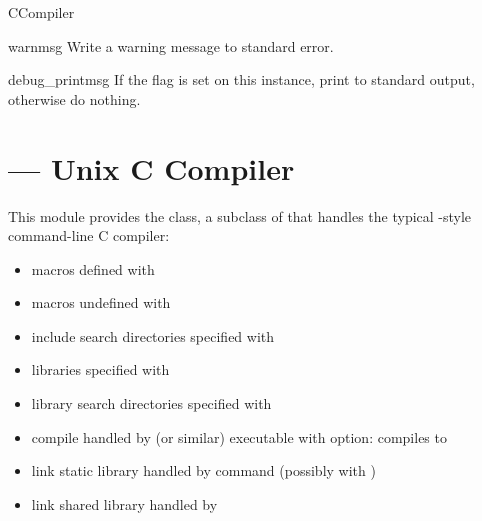 \documentclass{manual}
\begin{document}
\begin{classdesc}{CCompiler}{}
\begin{methoddesc}{warn}{msg}
Write a warning message  to standard error.
\end{methoddesc}

\begin{methoddesc}{debug_print}{msg}
If the  flag is set on this  instance, print 
 to standard output, otherwise do nothing.
\end{methoddesc}

\end{classdesc}

%

\section{ --- Unix C Compiler}

This module provides the  class, a subclass of 
 that handles the typical \UNIX-style command-line 
C compiler:

\begin{itemize}
\item macros defined with 
\item macros undefined with 
\item include search directories specified with
\item libraries specified with 
\item library search directories specified with 
\item compile handled by  (or similar) executable with
       option: compiles  to 
\item link static library handled by  command (possibly
      with )
\item link shared library handled by  
\end{itemize}
\end{document}
